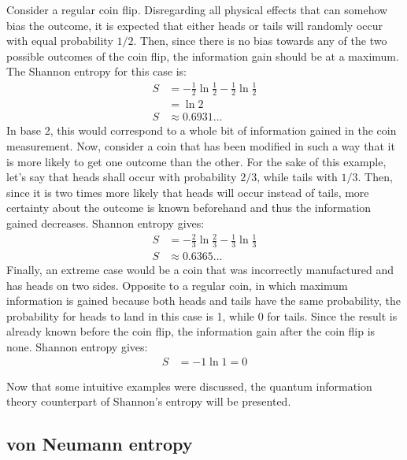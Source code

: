 	Consider a regular coin flip. Disregarding all physical effects that can somehow bias the outcome, it is expected that either heads or tails will randomly occur with equal probability $1/2$. Then, since there is no bias towards any of the two possible outcomes of the coin flip, the information gain should be at a maximum. The Shannon entropy for this case is:
	\begin{align}
	S &= -\frac{1}{2} \ln{\frac{1}{2}} - \frac{1}{2} \ln{\frac{1}{2}}  \nonumber\\
	&= \ln{2}  \nonumber \\
	S &\approx 0.6931 \nonumber \dots
	\end{align}
	In base 2, this would correspond to a whole bit of information gained in the coin measurement. Now, consider a coin that has been modified in such a way that it is more likely to get one outcome than the other. For the sake of this example, let's say that heads shall occur with probability $2/3$, while tails with $1/3$. Then, since it is two times more likely that heads will occur instead of tails, more certainty about the outcome is known beforehand and thus the information gained decreases. Shannon entropy gives:
	\begin{align}
	S &= -\frac{2}{3} \ln{\frac{2}{3}} - \frac{1}{3} \ln{\frac{1}{3}} \nonumber \\
	S &\approx 0.6365 \dots \nonumber
	\end{align}
	Finally, an extreme case would be a coin that was incorrectly manufactured and has heads on two sides. Opposite to a regular coin, in which maximum information is gained because both heads and tails have the same probability, the probability for heads to land in this case is 1, while 0 for tails. Since the result is already known before the coin flip, the information gain after the coin flip is none. Shannon entropy gives:
	\begin{align}
	S &= -1\ln{1} = 0 \nonumber
	\end{align}

	Now that some intuitive examples were discussed, the quantum information theory counterpart of Shannon's entropy will be presented.
	
	\subsection{von Neumann entropy}
	

